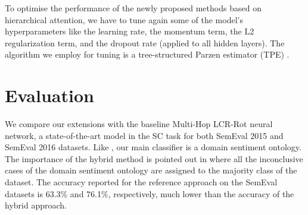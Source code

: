 \documentclass[hidelinks]{llncs}
\begin{document}
To optimise the performance of the newly proposed methods based on hierarchical attention, we have to tune again some of the model's hyperparameters like the learning rate, the momentum term, the L2 regularization term, and the dropout rate (applied to all hidden layers). The algorithm we employ for tuning is a tree-structured Parzen estimator (TPE) \cite{bergstra2011algorithms}.

\section{Evaluation}\label{Evaluation}

We compare our extensions with the baseline Multi-Hop LCR-Rot neural network, a state-of-the-art model in the SC task for both SemEval 2015 and SemEval 2016 datasets. Like \cite{wallaart2019hybrid}, our main classifier is a domain sentiment ontology. The importance of the hybrid method is pointed out in \cite{schouten2018ontology} where all the inconclusive cases of the domain sentiment ontology are assigned to the majority class of the dataset. The accuracy reported for the reference approach on the SemEval datasets is 63.3\% and 76.1\%, respectively, much lower than the accuracy of the hybrid approach.

\begin{table}[!htp]
\footnotesize
\centering
\setlength{\tabcolsep}{0pt} \caption{\footnotesize {Comparison of word embeddings for the Multi-Hop LCR-Rot model using accuracy. The best results are given in bold font.}}
\label{table:table_2}
\vspace{-0.5cm}
\end{table}
\end{document}
